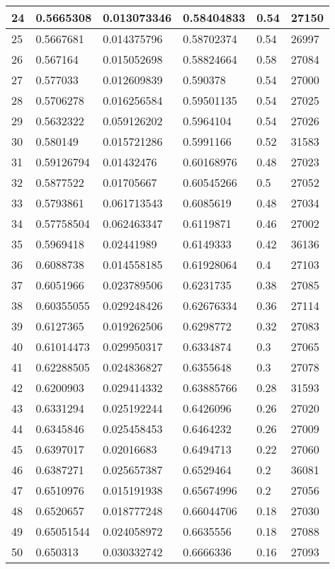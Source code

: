\begin{longtable}{|l|l|l|l|l|l|}
24 & 0.5665308 & 0.013073346 & 0.58404833 & 0.54 & 27150 \\ \hline 
25 & 0.5667681 & 0.014375796 & 0.58702374 & 0.54 & 26997 \\ \hline 
26 & 0.567164 & 0.015052698 & 0.58824664 & 0.58 & 27084 \\ \hline 
27 & 0.577033 & 0.012609839 & 0.590378 & 0.54 & 27000 \\ \hline 
28 & 0.5706278 & 0.016256584 & 0.59501135 & 0.54 & 27025 \\ \hline 
29 & 0.5632322 & 0.059126202 & 0.5964104 & 0.54 & 27026 \\ \hline 
30 & 0.580149 & 0.015721286 & 0.5991166 & 0.52 & 31583 \\ \hline 
31 & 0.59126794 & 0.01432476 & 0.60168976 & 0.48 & 27023 \\ \hline 
32 & 0.5877522 & 0.01705667 & 0.60545266 & 0.5 & 27052 \\ \hline 
33 & 0.5793861 & 0.061713543 & 0.6085619 & 0.48 & 27034 \\ \hline 
34 & 0.57758504 & 0.062463347 & 0.6119871 & 0.46 & 27002 \\ \hline 
35 & 0.5969418 & 0.02441989 & 0.6149333 & 0.42 & 36136 \\ \hline 
36 & 0.6088738 & 0.014558185 & 0.61928064 & 0.4 & 27103 \\ \hline 
37 & 0.6051966 & 0.023789506 & 0.6231735 & 0.38 & 27085 \\ \hline 
38 & 0.60355055 & 0.029248426 & 0.62676334 & 0.36 & 27114 \\ \hline 
39 & 0.6127365 & 0.019262506 & 0.6298772 & 0.32 & 27083 \\ \hline 
40 & 0.61014473 & 0.029950317 & 0.6334874 & 0.3 & 27065 \\ \hline 
41 & 0.62288505 & 0.024836827 & 0.6355648 & 0.3 & 27078 \\ \hline 
42 & 0.6200903 & 0.029414332 & 0.63885766 & 0.28 & 31593 \\ \hline 
43 & 0.6331294 & 0.025192244 & 0.6426096 & 0.26 & 27020 \\ \hline 
44 & 0.6345846 & 0.025458453 & 0.6464232 & 0.26 & 27009 \\ \hline 
45 & 0.6397017 & 0.02016683 & 0.6494713 & 0.22 & 27060 \\ \hline 
46 & 0.6387271 & 0.025657387 & 0.6529464 & 0.2 & 36081 \\ \hline 
47 & 0.6510976 & 0.015191938 & 0.65674996 & 0.2 & 27056 \\ \hline 
48 & 0.6520657 & 0.018777248 & 0.66044706 & 0.18 & 27030 \\ \hline 
49 & 0.65051544 & 0.024058972 & 0.6635556 & 0.18 & 27088 \\ \hline 
50 & 0.650313 & 0.030332742 & 0.6666336 & 0.16 & 27093 \\ \hline 
\end{longtable}